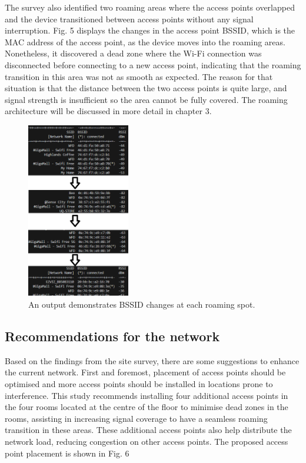 \documentclass[conference]{IEEEtran}
\begin{document}
The survey also identified two roaming areas where the access points overlapped and the device transitioned between access points without any signal interruption. Fig. 5 displays the changes in the access point BSSID, which is the MAC address of the access point, as the device moves into the roaming areas. Nonetheless, it discovered a dead zone where the Wi-Fi connection was disconnected before connecting to a new access point, indicating that the roaming transition in this area was not as smooth as expected. The reason for that situation is that the distance between the two access points is quite large, and signal strength is insufficient so the area cannot be fully covered. The roaming architecture will be discussed in more detail in chapter 3.

\begin{figure}[htbp]
    \centering
    \includegraphics[width=0.4\textwidth]{rssid_change.png}
    \caption{An output demonstrates BSSID changes at each roaming spot.}
\end{figure}

\subsection{Recommendations for the network}

Based on the findings from the site survey, there are some suggestions to enhance the current network. First and foremost, placement of access points should be optimised and more access points should be installed in locations prone to interference. This study recommends installing four additional access points in the four rooms located at the centre of the floor to minimise dead zones in the rooms, assisting in increasing signal coverage to have a seamless roaming transition in these areas. These additional access points also help distribute the network load, reducing congestion on other access points. The proposed access point placement is shown in Fig. 6
\end{document}
